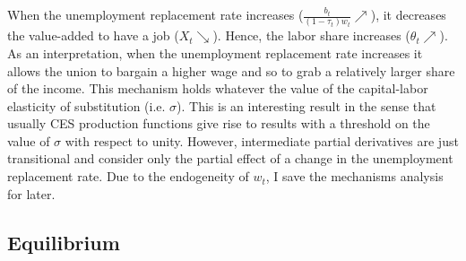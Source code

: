 When the unemployment replacement rate increases ($\frac{b_t}{(1-\tau_t)w_t} \nearrow$), it decreases the value-added to have a job ($X_t \searrow$). Hence, the labor share increases ($\theta_t \nearrow$). As an interpretation, when the unemployment replacement rate increases it allows the union to bargain a higher wage and so to grab a relatively larger share of the income. This mechanism holds whatever the value of the capital-labor elasticity of substitution (i.e. $\sigma$). This is an interesting result in the sense that usually CES production functions give rise to results with a threshold on the value of $\sigma$ with respect to unity. However, intermediate partial derivatives are just transitional and consider only the partial effect of a change in the unemployment replacement rate. Due to the endogeneity of $w_t$, I save the mechanisms analysis for later. 


\subsection{Equilibrium}\label{equilibrium}

